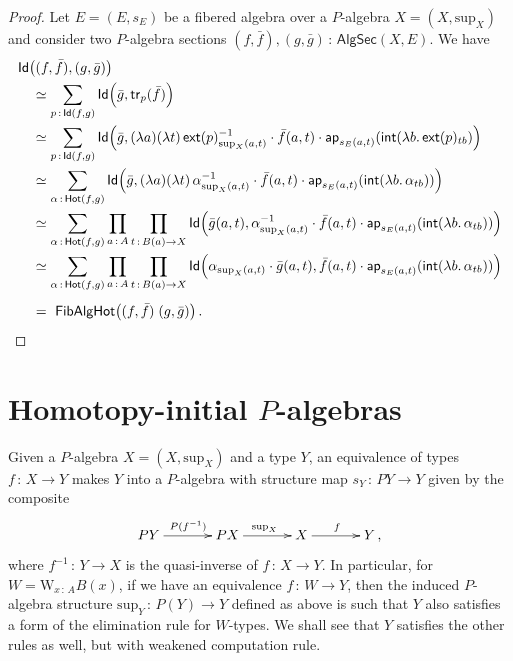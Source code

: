\documentclass[10pt,a4paper,oneside,reqno]{amsart}
\theoremstyle{mythm}
\theoremstyle{mydef}
\theoremstyle{myrmk}
\newcommand{\co}{\,{:}\,}
\newcommand{\ct}{\cdot}
\newcommand{\trans}{\mathsf{tr}}
\newcommand{\Hot}{\mathsf{Hot}}
\newcommand{\ext}{\mathsf{ext}}
\renewcommand{\int}{\mathsf{int}}
\newcommand{\Id}{\mathsf{Id}}
\newcommand{\app}{\mathsf{ap}}
\newcommand{\W}{\mathrm{W}}
\renewcommand{\sup}{\mathrm{sup}}
\newcommand{\FibAlgHot}{\mathsf{FibAlgHot}}
\newcommand{\PalgSec}{\mathsf{AlgSec}}
\begin{document}
\begin{proof}Let $E = (E, s_E)$ be a fibered algebra over a $P$-algebra $X = (X, \sup_X)$ and consider two $P$-algebra
sections $(f,\bar{f}), (g,\bar{g}) \co \PalgSec(X,E)$. We have
\begin{align*}
 & \Id\big( (f,\bar{f}),  (g,\bar{g}) \big) \\ 
& \quad \simeq \sum_{p \co \Id( f , g)} \Id \Big(\bar{g} , \trans_p ( \bar{f} ) \Big)  \\
& \quad \simeq \sum_{p \co \Id( f , g)} \Id \Big(\bar{g}, 
(\lambda a)(\lambda t) \, \ext(p)_{\sup_X(a,t)}^{-1} \ct \bar{f}(a,t) \ct \app_{s_E(a,t)}(\int (\lambda b . \, \ext(p)_{t  b})  \Big)  \\
& \quad \simeq \sum_{\alpha \co \Hot( f, g)} \Id \Big(\bar{g},  (\lambda a) (\lambda t) \, \alpha_{\sup_X(a,t)}^{-1} \ct \bar{f}(a,t) \ct 
\app_{s_E(a,t)} (\int (\lambda b. \,  \alpha_{t b}))  \Big)  \\
&\quad \simeq \sum_{\alpha \co \Hot( f, g)} \prod_{a \co A}\prod_{t \co B(a) \to X } \Id \Big(\bar{g}(a,t) , \alpha_{\sup_X(a,t)}^{-1} \ct \bar{f}(a,t) \ct \app_{s_E(a,t)}(\int (\lambda b. \, \alpha_{t  b})) \Big)  \\ 
& \quad \simeq \sum_{\alpha \co \Hot( f, g)} \prod_{a \co A}\prod_{t \co B(a) \to X } \Id \Big(\alpha_{\sup_X(a,t)} \ct \bar{g}(a,t) , \bar{f}(a,t) \ct 
\app_{s_E(a,t)}(\int  (\lambda b. \,  \alpha_{t  b})) \Big) \\[1ex]
& \quad = \  \FibAlgHot \big( (f,\bar{f}) \; (g,\bar{g}) \big) \, . \qedhere
\end{align*}  
\end{proof}


 

\section{Homotopy-initial $P$-algebras}

Given a $P$-algebra $X = (X, \sup_X)$ and a type $Y$, an equivalence of types $f \co X \to Y$ makes $Y$ into a $P$-algebra with structure map $s_Y \co PY \to Y$ given by the composite
\[
\xymatrix@C=1.2cm{
PY \ar[r]^{P(f^{-1})} & PX \ar[r]^{\sup_X} & X \ar[r]^f & Y \, , }
\]
 where $f^{-1} \co Y \to X$ is the quasi-inverse of $f \co X \to Y$. In particular, for $W = \W_{x \co A} B(x)$, if we have an equivalence  
 $f \co W \to Y$, then the induced $P$-algebra structure $\sup_Y \co P(Y)\to Y$ defined as above is such that $Y$ also satisfies 
 a form of the elimination rule for $W$-types.  We shall see that $Y$ satisfies the other rules as well, but with weakened computation rule.
\end{document}
